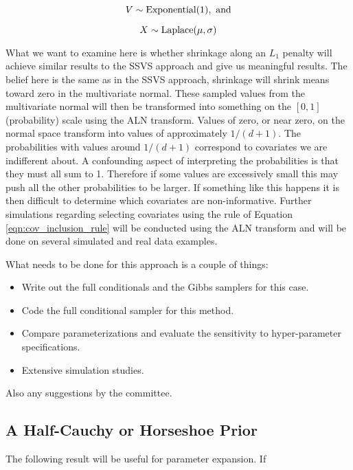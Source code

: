 \begin{equation}\newnot{symbol:exponential_dist}
V \sim \text{Exponential}(1), \text{ and}
\end{equation}

\begin{equation}\newnot{symbol:laplace_dist}
X \sim \text{Laplace}(\mu, \sigma)
\end{equation}

What we want to examine here is whether shrinkage along an $L_1$ penalty will achieve similar results to the SSVS approach and give us meaningful results. The belief here is the same as in the SSVS approach, shrinkage will shrink means toward zero in the multivariate normal. These sampled values from the multivariate normal will then be transformed into something on the $[0,1]$ (probability) scale using the ALN transform. Values of zero, or near zero, on the normal space transform into values of approximately $1/(d+1)$. The probabilities with values around $1/(d+1)$ correspond to covariates we are indifferent about. A confounding aspect of interpreting the probabilities is that they must all sum to 1. Therefore if some values are excessively small this may push all the other probabilities to be larger. If something like this happens it is then difficult to determine which covariates are non-informative. Further simulations regarding selecting covariates using the rule of Equation \ref{eqn:cov_inclusion_rule} will be conducted using the ALN transform and will be done on several simulated and real data examples.    

What needs to be done for this approach is a couple of things: 

\begin{itemize}
\item Write out the full conditionals and the Gibbs samplers for this case. 
\item Code the full conditional sampler for this method. 
\item Compare parameterizations and evaluate the sensitivity to hyper-parameter specifications. 
\item Extensive simulation studies. 
\end{itemize}
Also any suggestions by the committee.
\subsection{A Half-Cauchy or Horseshoe Prior}

The following result will be useful for parameter expansion. If 

